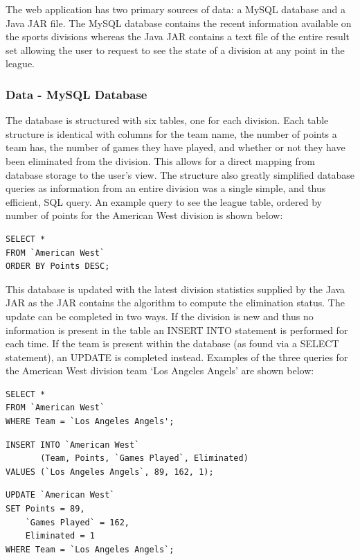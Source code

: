 The web application has two primary sources of data: a MySQL database and a
Java JAR file. The MySQL database contains the recent information available
on the sports divisions whereas the Java JAR contains a text file of the entire
result set allowing the user to request to see the state of a division at any
point in the league.

\subsubsection{Data - MySQL Database}

The database is structured with six tables, one for each division. Each table
structure is identical with columns for the team name, the number of points
a team has, the number of games they have played, and whether or not they have
been eliminated from the division. This allows for a direct mapping from
database storage to the user's view. The structure also greatly simplified 
database queries as information from an entire division was a single simple, and 
thus efficient, SQL query. An example query to see the league table, ordered by 
number of points for the American West division is shown below:

\begin{verbatim}
SELECT *
FROM `American West`
ORDER BY Points DESC;
\end{verbatim}

This database is updated with the latest division statistics supplied by the 
Java JAR as the JAR contains the algorithm to compute the elimination status.
The update can be completed in two ways. If the division is new and thus no
information is present in the table an INSERT INTO statement is performed for
each time. If the team is present within the database (as found via a SELECT
statement), an UPDATE is completed instead. Examples of the three queries
for the American West division team `Los Angeles Angels' are shown below:

\begin{verbatim}
SELECT *
FROM `American West`
WHERE Team = `Los Angeles Angels';
\end{verbatim}

\begin{verbatim}
INSERT INTO `American West`
       (Team, Points, `Games Played`, Eliminated)
VALUES (`Los Angeles Angels`, 89, 162, 1);
\end{verbatim}

\begin{verbatim}
UPDATE `American West`
SET Points = 89,
    `Games Played` = 162,
    Eliminated = 1
WHERE Team = `Los Angeles Angels`;
\end{verbatim}

